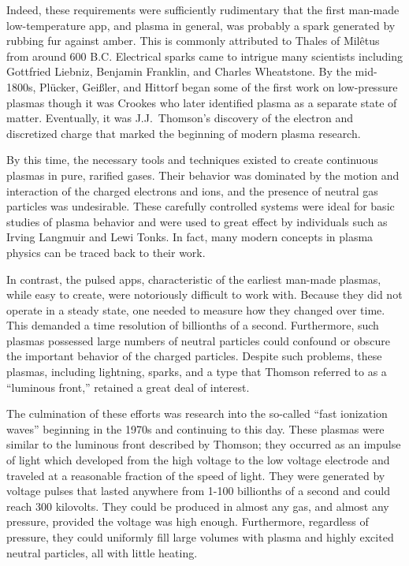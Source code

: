 Indeed, these requirements were sufficiently rudimentary that the first man-made
low-temperature \acs{app}, and plasma in general, was probably a spark generated
by rubbing fur against amber. This is commonly attributed to Thales of
Mil\^{e}tus from around 600 B.C. Electrical sparks came to intrigue many
scientists including Gottfried Liebniz, Benjamin Franklin, and Charles
Wheatstone. By the mid-1800s, Pl\"{u}cker, Gei\ss{}ler, and Hittorf began some
of the first work on low-pressure plasmas though it was Crookes who later
identified plasma as a separate state of matter. Eventually, it was J.J.\
Thomson's discovery of the electron and discretized charge that marked the
beginning of modern plasma research.

By this time, the necessary tools and techniques existed to create continuous
plasmas in pure, rarified gases. Their behavior was dominated by the motion and
interaction of the charged electrons and ions, and the presence of neutral gas
particles was undesirable. These carefully controlled systems were ideal for basic
studies of plasma behavior and were used to great effect by individuals such as
Irving Langmuir and Lewi Tonks. In fact, many modern concepts in plasma physics
can be traced back to their work.

In contrast, the pulsed \acs{app}s, characteristic of the earliest man-made
plasmas, while easy to create, were notoriously difficult to work with. Because
they did not operate in a steady state, one needed to measure how they changed
over time. This demanded a time resolution of billionths of a second.
Furthermore, such plasmas possessed large numbers of neutral particles could
confound or obscure the important behavior of the charged particles. Despite
such problems, these plasmas, including lightning, sparks, and a type that
Thomson referred to as a ``luminous front,'' retained a great deal of interest.

The culmination of these efforts was research into the so-called ``fast
ionization waves'' beginning in the 1970s and continuing to this day. These
plasmas were similar to the luminous front described by Thomson; they occurred
as an impulse of light which developed from the high voltage to the low voltage
electrode and traveled at a reasonable fraction of the speed of light. They were
generated by voltage pulses that lasted anywhere from 1-100 billionths of a
second and could reach 300 kilovolts. They could be produced in almost any gas,
and almost any pressure, provided the voltage was high enough. Furthermore,
regardless of pressure, they could uniformly fill large volumes with plasma and
highly excited neutral particles, all with little heating.

